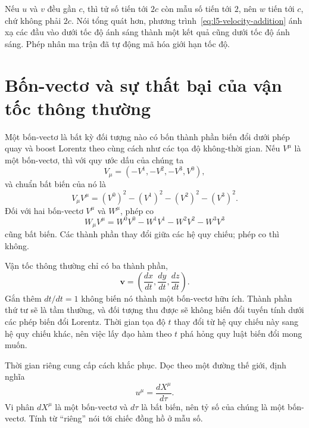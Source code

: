 Nếu \(u\) và \(v\) đều gần \(c\), thì tử số tiến tới \(2c\) còn mẫu số tiến tới \(2\), nên \(w\) tiến tới \(c\), chứ không phải \(2c\). Nói tổng quát hơn, phương trình~\eqref{eq:l5-velocity-addition} ánh xạ các đầu vào dưới tốc độ ánh sáng thành một kết quả cũng dưới tốc độ ánh sáng. Phép nhân ma trận đã tự động mã hóa giới hạn tốc độ.

\section{Bốn-vectơ và sự thất bại của vận tốc thông thường}

Một bốn-vectơ là bất kỳ đối tượng nào có bốn thành phần biến đổi dưới phép quay và boost Lorentz theo cùng cách như các tọa độ không-thời gian. Nếu \(V^\mu\) là một bốn-vectơ, thì với quy ước dấu của chúng ta
\begin{equation}
V_\mu=(-V^1,-V^2,-V^3,V^0),
\end{equation}
và chuẩn bất biến của nó là
\begin{equation}
V_\mu V^\mu=(V^0)^2-(V^1)^2-(V^2)^2-(V^3)^2.
\end{equation}
Đối với hai bốn-vectơ \(V^\mu\) và \(W^\mu\), phép co
\begin{equation}
W_\mu V^\mu
=W^0V^0-W^1V^1-W^2V^2-W^3V^3
\end{equation}
cũng bất biến. Các thành phần thay đổi giữa các hệ quy chiếu; phép co thì không.

Vận tốc thông thường chỉ có ba thành phần,
\begin{equation}
\mathbf v=\left(\frac{dx}{dt},\frac{dy}{dt},\frac{dz}{dt}\right).
\end{equation}
Gắn thêm \(dt/dt=1\) không biến nó thành một bốn-vectơ hữu ích. Thành phần thứ tư sẽ là tầm thường, và đối tượng thu được sẽ không biến đổi tuyến tính dưới các phép biến đổi Lorentz. Thời gian tọa độ \(t\) thay đổi từ hệ quy chiếu này sang hệ quy chiếu khác, nên việc lấy đạo hàm theo \(t\) phá hỏng quy luật biến đổi mong muốn.

Thời gian riêng cung cấp cách khắc phục. Dọc theo một đường thế giới, định nghĩa
\begin{equation}
u^\mu=\frac{dX^\mu}{d\tau}.
\label{eq:l5-four-velocity}
\end{equation}
Vi phân \(dX^\mu\) là một bốn-vectơ và \(d\tau\) là bất biến, nên tỷ số của chúng là một bốn-vectơ. Tính từ ``riêng'' nói tới chiếc đồng hồ ở mẫu số.


